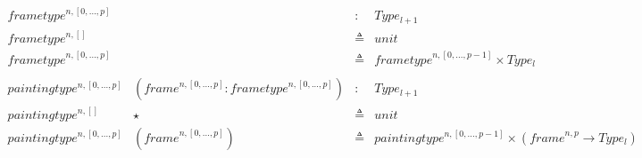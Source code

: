 \documentclass[a4paper,english,cleveref,autoref,thm-restate]{article}
\newcommand{\defeq}{\triangleq}
\newcommand{\myframe}{\mathit{frame}}
\newcommand{\myframetype}{\mathit{frametype}}
\newcommand{\paintingtype}{\mathit{paintingtype}}
\begin{document}
\begin{enumerate}
$$
\begin{array}{llcl}
\myframetype^{n,[0,...,p]} & & : & Type_{l+1} \\
\myframetype^{n,[]} & & \defeq & unit \\
\myframetype^{n,[0,...,p]} & & \defeq & \myframetype^{n,[0,...,p-1]} \times Type_l\\
\\
\paintingtype^{n,[0,...,p]} & (\myframe^{n,[0,...,p]}:\myframetype^{n,[0,...,p]}) & : & Type_{l+1} \\
\paintingtype^{n,[]} & \star & \defeq & unit \\
\paintingtype^{n,[0,...,p]} & (\myframe^{n,[0,...,p]}) & \defeq & \paintingtype^{n,[0,...,p-1]} \times (\myframe^{n,p} \rightarrow Type_l)\\
\end{array}
$$


\end{enumerate}
\end{document}
